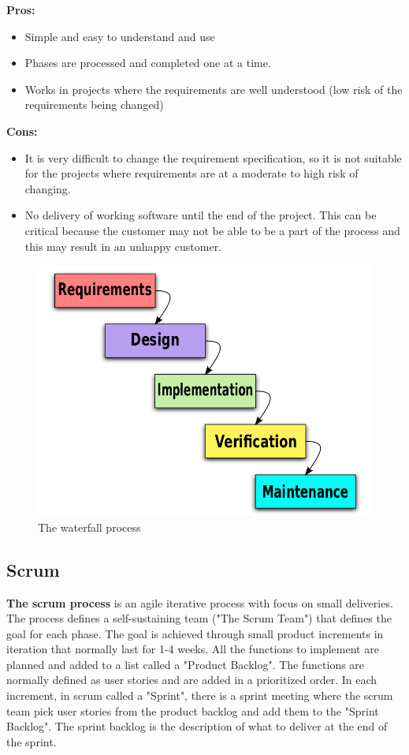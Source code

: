 {\bf Pros: }
\begin{itemize}
	\item Simple and easy to understand and use
	\item Phases are processed and completed one at a time.
	\item Works in projects where the requirements are well understood (low risk of the requirements being changed)
\end{itemize}
\clearpage
{\bf Cons: }
\begin{itemize}
	\item It is very difficult to change the requirement specification, so it is not suitable for the projects where requirements are at a moderate to high risk of changing.
	\item No delivery of working software until the end of the project. This can be critical because the customer may not
	be able to be a part of the process and this may result in an unhappy customer.
\end{itemize}

\begin{figure}[!ht]
\centering
\includegraphics[scale=0.3]{pictures/Waterfall_model.png}
\caption{The waterfall process}
\label{overflow}
\end{figure}


\subsection{Scrum}
{\bf The scrum process }\cite{wikiScrum} is an agile iterative process with focus on small deliveries. The process
defines a self-sustaining team ("The Scrum Team") that defines the goal for each phase. The goal 
is achieved through small product increments in iteration that normally last for 1-4 weeks. 
All the functions to implement are planned and added to a list called a "Product Backlog". The
functions are normally defined as user stories and are added in a prioritized order. In each increment, 
in scrum called a "Sprint", there is a sprint meeting where the scrum team pick user stories from the 
product backlog and add them to the "Sprint Backlog". The sprint backlog is the description of what 
to deliver at the end of the sprint.

